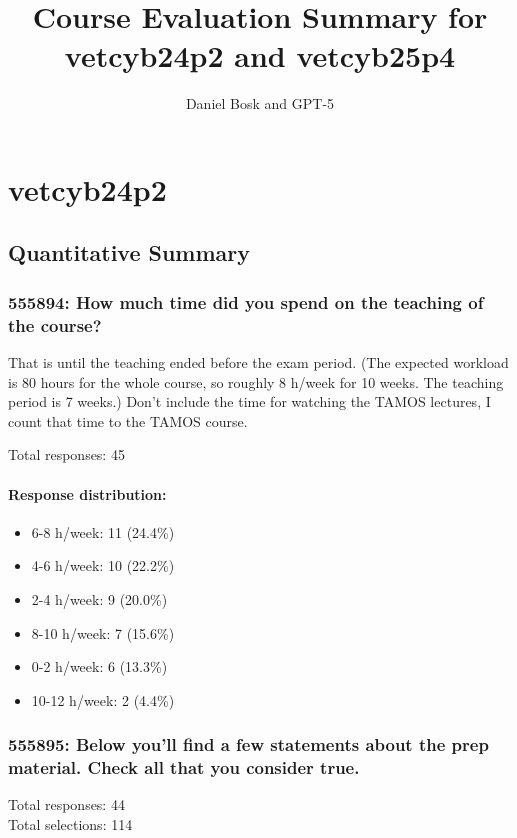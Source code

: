 \documentclass[a4paper]{report}
\title{Course Evaluation Summary for vetcyb24p2 and vetcyb25p4}
\author{Daniel Bosk and GPT-5}
\begin{document}
\maketitle
\tableofcontents

\chapter{vetcyb24p2}

\section{Quantitative Summary}

\subsection{555894: How much time did you spend on the teaching of the course?}

That is until the teaching ended before the exam period. (The expected workload 
is 80 hours for the whole course, so roughly 8 h/week for 10 weeks. The 
teaching period is 7 weeks.)
Don't include the time for watching the TAMOS lectures, I count that time to 
the TAMOS course.

Total responses: 45\\

\subsubsection{Response distribution:}
\begin{itemize}
  \item 6-8 h/week: 11 (24.4\%)
  \item 4-6 h/week: 10 (22.2\%)
  \item 2-4 h/week: 9 (20.0\%)
  \item 8-10 h/week: 7 (15.6\%)
  \item 0-2 h/week: 6 (13.3\%)
  \item 10-12 h/week: 2 (4.4\%)
\end{itemize}

\subsection{555895: Below you'll find a few statements about the prep material. Check all that you consider true.}

Total responses: 44\\
Total selections: 114\\
\end{document}

